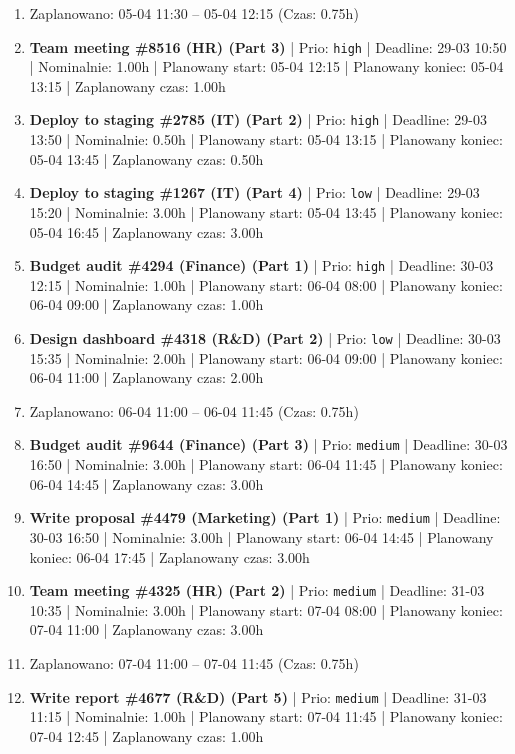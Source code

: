 {\begin{enumerate}
  \item [\textbf{PRZERWA}] Zaplanowano: 05-04 11:30 -- 05-04 12:15 (Czas: 0.75h)
  \item [\textbf{14624}] \textbf{Team meeting \#8516 (HR) (Part 3)} | Prio: \texttt{high} | Deadline: 29-03 10:50 | Nominalnie: 1.00h | Planowany start: 05-04 12:15 | Planowany koniec: 05-04 13:15 | Zaplanowany czas: 1.00h
  \item [\textbf{14623}] \textbf{Deploy to staging \#2785 (IT) (Part 2)} | Prio: \texttt{high} | Deadline: 29-03 13:50 | Nominalnie: 0.50h | Planowany start: 05-04 13:15 | Planowany koniec: 05-04 13:45 | Zaplanowany czas: 0.50h
  \item [\textbf{14686}] \textbf{Deploy to staging \#1267 (IT) (Part 4)} | Prio: \texttt{low} | Deadline: 29-03 15:20 | Nominalnie: 3.00h | Planowany start: 05-04 13:45 | Planowany koniec: 05-04 16:45 | Zaplanowany czas: 3.00h
  \item [\textbf{14619}] \textbf{Budget audit \#4294 (Finance) (Part 1)} | Prio: \texttt{high} | Deadline: 30-03 12:15 | Nominalnie: 1.00h | Planowany start: 06-04 08:00 | Planowany koniec: 06-04 09:00 | Zaplanowany czas: 1.00h
  \item [\textbf{14691}] \textbf{Design dashboard \#4318 (R\&D) (Part 2)} | Prio: \texttt{low} | Deadline: 30-03 15:35 | Nominalnie: 2.00h | Planowany start: 06-04 09:00 | Planowany koniec: 06-04 11:00 | Zaplanowany czas: 2.00h
  \item [\textbf{PRZERWA}] Zaplanowano: 06-04 11:00 -- 06-04 11:45 (Czas: 0.75h)
  \item [\textbf{14659}] \textbf{Budget audit \#9644 (Finance) (Part 3)} | Prio: \texttt{medium} | Deadline: 30-03 16:50 | Nominalnie: 3.00h | Planowany start: 06-04 11:45 | Planowany koniec: 06-04 14:45 | Zaplanowany czas: 3.00h
  \item [\textbf{14660}] \textbf{Write proposal \#4479 (Marketing) (Part 1)} | Prio: \texttt{medium} | Deadline: 30-03 16:50 | Nominalnie: 3.00h | Planowany start: 06-04 14:45 | Planowany koniec: 06-04 17:45 | Zaplanowany czas: 3.00h
  \item [\textbf{14641}] \textbf{Team meeting \#4325 (HR) (Part 2)} | Prio: \texttt{medium} | Deadline: 31-03 10:35 | Nominalnie: 3.00h | Planowany start: 07-04 08:00 | Planowany koniec: 07-04 11:00 | Zaplanowany czas: 3.00h
  \item [\textbf{PRZERWA}] Zaplanowano: 07-04 11:00 -- 07-04 11:45 (Czas: 0.75h)
  \item [\textbf{14640}] \textbf{Write report \#4677 (R\&D) (Part 5)} | Prio: \texttt{medium} | Deadline: 31-03 11:15 | Nominalnie: 1.00h | Planowany start: 07-04 11:45 | Planowany koniec: 07-04 12:45 | Zaplanowany czas: 1.00h

\end{enumerate}}
